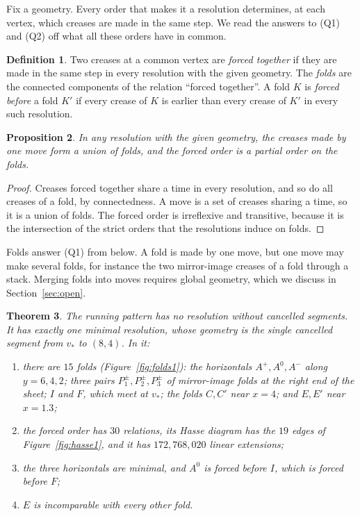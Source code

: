 \documentclass[11pt]{article}
\newtheorem{theorem}{Theorem}
\newtheorem{proposition}[theorem]{Proposition}
\theoremstyle{definition}
\newtheorem{definition}[theorem]{Definition}
\theoremstyle{remark}
\newcommand{\vstar}{v_\ast}
\begin{document}
Fix a geometry. Every order that makes it a resolution determines, at each vertex, which creases are made in the same step. We read the answers to (Q1) and (Q2) off what all these orders have in common.

\begin{definition}\label{def:folds}
Two creases at a common vertex are \emph{forced together} if they are made in the same step in every resolution with the given geometry. The \emph{folds} are the connected components of the relation ``forced together''. A fold $K$ is \emph{forced before} a fold $K'$ if every crease of $K$ is earlier than every crease of $K'$ in every such resolution.
\end{definition}

\begin{proposition}\label{prop:moves}
In any resolution with the given geometry, the creases made by one move form a union of folds, and the forced order is a partial order on the folds.
\end{proposition}

\begin{proof}
Creases forced together share a time in every resolution, and so do all creases of a fold, by connectedness. A move is a set of creases sharing a time, so it is a union of folds. The forced order is irreflexive and transitive, because it is the intersection of the strict orders that the resolutions induce on folds.
\end{proof}

Folds answer (Q1) from below. A fold is made by one move, but one move may make several folds, for instance the two mirror-image creases of a fold through a stack. Merging folds into moves requires global geometry, which we discuss in Section~\ref{sec:open}.

\begin{theorem}\label{thm:running}
The running pattern has no resolution without cancelled segments. It has exactly one minimal resolution, whose geometry is the single cancelled segment from $\vstar$ to $(8,4)$. In it:
\begin{enumerate}
\item there are $15$ folds (Figure~\ref{fig:folds1}): the horizontals $A^+,A^0,A^-$ along $y=6,4,2$; three pairs $P_1^\pm,P_2^\pm,P_3^\pm$ of mirror-image folds at the right end of the sheet; $I$ and $F$, which meet at $\vstar$; the folds $C,C'$ near $x=4$; and $E,E'$ near $x=1.3$;
\item the forced order has $30$ relations, its Hasse diagram has the $19$ edges of Figure~\ref{fig:hasse1}, and it has $172{,}768{,}020$ linear extensions;
\item the three horizontals are minimal, and $A^0$ is forced before $I$, which is forced before $F$;
\item $E$ is incomparable with every other fold.
\end{enumerate}
\end{theorem}
\end{document}
